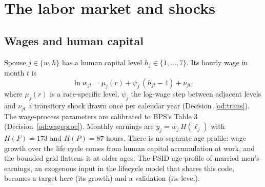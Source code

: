 \documentclass[11pt]{article}
\newcommand{\1}{\mathbf{1}}
\begin{document}
\section{The labor market and shocks}\label{sec:labor}

\subsection{Wages and human capital}

Spouse $j \in \{w, h\}$ has a human capital level $h_j \in \{1, \dots, 7\}$. Its hourly wage in month $t$ is
\begin{equation}\label{eq:wage}
  \ln w_{jt} = \mu_j(r) + \psi_j\,(h_{jt} - 4) + \nu_{jt},
\end{equation}
where $\mu_j(r)$ is a race-specific level, $\psi_j$ the log-wage step between adjacent levels and $\nu_{jt}$ a transitory
shock drawn once per calendar year (Decision~\ref{od:trans}). The wage-process parameters are calibrated to BPS's Table 3
(Decision~\ref{od:wageproc}). Monthly earnings are $y_j = w_j\, H(\ell_j)$ with $H(F) = 173$ and $H(P) = 87$ hours. There is no separate age
profile: wage growth over the life cycle comes from human capital accumulation at work, and the bounded grid flattens
it at older ages. The PSID age profile of married men's earnings, an exogenous input in the lifecycle model that shares
this code, becomes a target here (its growth) and a validation (its level).
\end{document}
